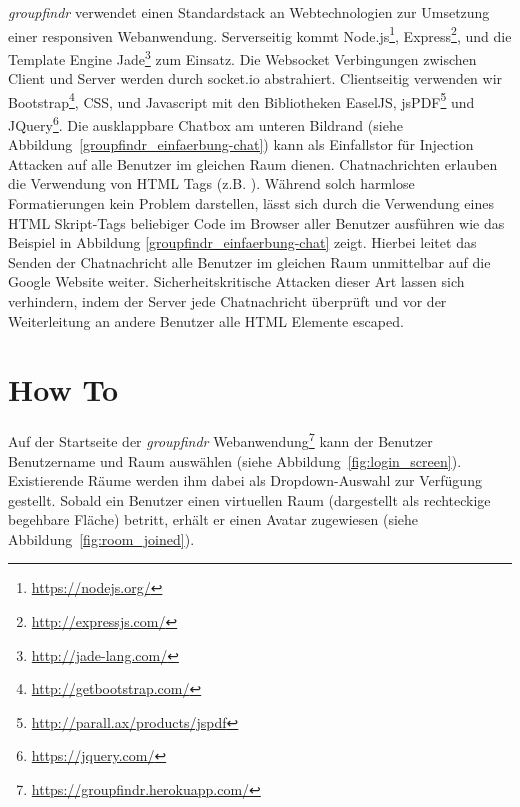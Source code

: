 \emph{groupfindr} verwendet einen Standardstack an Webtechnologien zur Umsetzung einer responsiven Webanwendung. Serverseitig kommt Node.js\footnote{\url{https://nodejs.org/}}, Express\footnote{\url{http://expressjs.com/}}, und die Template Engine Jade\footnote{\url{http://jade-lang.com/}} zum Einsatz. Die Websocket Verbingungen zwischen Client und Server werden durch socket.io abstrahiert. Clientseitig verwenden wir Bootstrap\footnote{\url{http://getbootstrap.com/}}, CSS, und Javascript mit den Bibliotheken EaselJS, jsPDF\footnote{\url{http://parall.ax/products/jspdf}} und JQuery\footnote{\url{https://jquery.com/}}.
\newline\newline
Die ausklappbare Chatbox am unteren Bildrand (siehe Abbildung~\ref{groupfindr_einfaerbung-chat}) kann als Einfallstor für Injection Attacken auf alle Benutzer im gleichen Raum dienen. Chatnachrichten erlauben die Verwendung von HTML Tags (z.B. ). Während solch harmlose Formatierungen kein Problem darstellen, lässt sich durch die Verwendung eines HTML Skript-Tags beliebiger Code im Browser aller Benutzer ausführen wie das Beispiel in Abbildung \ref{groupfindr_einfaerbung-chat} zeigt. Hierbei leitet das Senden der Chatnachricht  alle Benutzer im gleichen Raum unmittelbar auf die Google Website weiter. Sicherheitskritische Attacken dieser Art lassen sich verhindern, indem der Server jede Chatnachricht überprüft und vor der Weiterleitung an andere Benutzer alle HTML Elemente escaped.

\section{How To}
\label{how_to}

Auf der Startseite der \emph{groupfindr} Webanwendung\footnote{\url{https://groupfindr.herokuapp.com/}} kann der Benutzer Benutzername und Raum auswählen (siehe Abbildung~\ref{fig:login_screen}). Existierende Räume werden ihm dabei als Dropdown-Auswahl zur Verfügung gestellt. Sobald ein Benutzer einen virtuellen Raum (dargestellt als rechteckige begehbare Fläche) betritt, erhält er einen Avatar zugewiesen (siehe Abbildung~\ref{fig:room_joined}).

